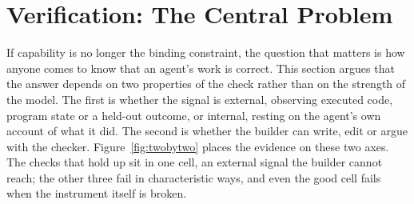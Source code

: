 \section{Verification: The Central Problem}\label{sec:verification}

If capability is no longer the binding constraint, the question that matters is how anyone comes to know that an agent's work is correct. This section argues that the answer depends on two properties of the check rather than on the strength of the model. The first is whether the signal is external, observing executed code, program state or a held-out outcome, or internal, resting on the agent's own account of what it did. The second is whether the builder can write, edit or argue with the checker. Figure~\ref{fig:twobytwo} places the evidence on these two axes. The checks that hold up sit in one cell, an external signal the builder cannot reach; the other three fail in characteristic ways, and even the good cell fails when the instrument itself is broken.

